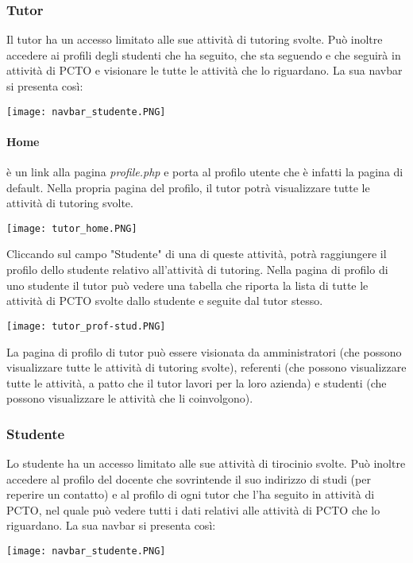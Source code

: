 \documentclass[12pt]{article}
\begin{document}
\subsubsection{Tutor}
Il tutor ha un accesso limitato alle sue attività di tutoring svolte. Può inoltre accedere ai profili degli studenti che ha seguito, che sta seguendo e che seguirà in attività di PCTO e visionare le tutte le attività che lo riguardano.
La sua navbar si presenta così:
\begin{center}
    \texttt{[image: navbar\_studente.PNG]}
\end{center}
\bigskip

\paragraph{Home} è un link alla pagina \textit{profile.php} e porta al profilo utente che è infatti la pagina di default.
Nella propria pagina del profilo, il tutor potrà visualizzare tutte le attività di tutoring svolte.
\begin{center}
    \texttt{[image: tutor\_home.PNG]} 
\end{center}
Cliccando sul campo "Studente" di una di queste attività, potrà raggiungere il profilo dello studente relativo all'attività di tutoring. Nella pagina di profilo di uno studente il tutor può vedere una tabella che riporta la lista di tutte le attività di PCTO svolte dallo studente e seguite dal tutor stesso.
\begin{center}
    \texttt{[image: tutor\_prof-stud.PNG]} 
\end{center}
La pagina di profilo di tutor può essere visionata da amministratori (che possono visualizzare tutte le attività di tutoring svolte), referenti (che possono visualizzare tutte le attività, a patto che il tutor lavori per la loro azienda) e studenti (che possono visualizzare le attività che li coinvolgono).

\subsubsection{Studente}
Lo studente ha un accesso limitato alle sue attività di tirocinio svolte. Può inoltre accedere al profilo del docente che sovrintende il suo indirizzo di studi (per reperire un contatto) e al profilo di ogni tutor che l'ha seguito in attività di PCTO, nel quale può vedere tutti i dati relativi alle attività di PCTO che lo riguardano.
La sua navbar si presenta così:
\begin{center}
    \texttt{[image: navbar\_studente.PNG]}
\end{center}
\bigskip
\end{document}
